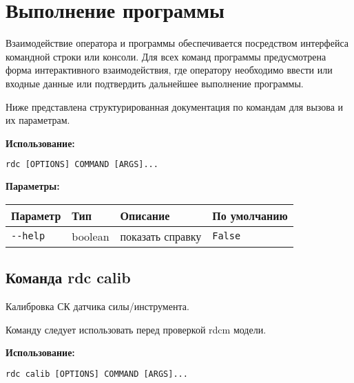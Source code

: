 \newpage
\section{Выполнение программы}

Взаимодействие оператора и программы обеспечивается посредством интерфейса командной строки или консоли.
Для всех команд программы предусмотрена форма интерактивного взаимодействия, где оператору необходимо ввести или входные данные или подтвердить дальнейшее выполнение программы.

Ниже представлена структурированная документация по командам для вызова и их параметрам.

\textbf{Использование:}
\begin{lstlisting}[language=python, numbers=none, frame=single]
    rdc [OPTIONS] COMMAND [ARGS]...
\end{lstlisting}

\textbf{Параметры:}
\begin{center}
\fontsize{10pt}{10pt}\selectfont
\begin{longtable}[]{p{5cm}|p{2cm}|p{3.5cm}|p{5cm}}
    \hline
\toprule()
Параметр & Тип & Описание & По умолчанию \\
\hline
\midrule()
\endhead
\texttt{-\/-help} & boolean & показать справку &
\texttt{False} \\
\bottomrule()
\hline
\end{longtable}
\end{center}

\hypertarget{rdc-calib}{%
\subsection{Команда rdc calib}\label{rdc-calib}}

Калибровка СК датчика силы/инструмента.

Команду следует использовать перед проверкой rdcm модели.

\textbf{Использование:}
\begin{lstlisting}[language=python, numbers=none, frame=single]
rdc calib [OPTIONS] COMMAND [ARGS]...
\end{lstlisting}

